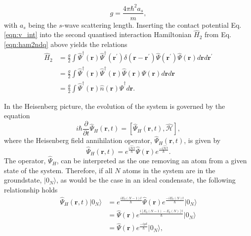 \begin{equation}
	g = \frac{4\pi\hbar^2 a_s}{m},
\end{equation}
with $a_s$ being the $s$-wave scattering length. Inserting the contact potential Eq. \eqref{eqn:v_int} into the second quantised interaction Hamiltonian $\hat{H}_2$ from Eq. \eqref{eqn:ham2ndq} above yields the relations
\begin{subequations}
\begin{align}
\hat{H}_2 &= \frac{g}{2} \int \hat{\Psi}^{\dagger}(\mathbf{r})\hat{\Psi}^{\dagger}(\mathbf{r}^{\prime}) \delta\left(\textbf{r} - \textbf{r}^{\prime}\right)\hat{\Psi}(\mathbf{r}^{\prime})\hat{\Psi}(\textbf{r})d\textbf{r}d\textbf{r}^{\prime} \\
 & = \frac{g}{2}\int \hat{\Psi}^{\dagger}(\textbf{r})\hat{\Psi}^{\dagger}(\mathbf{r}) \hat{\Psi}(\mathbf{r})\hat{\Psi}(\mathbf{r})d\mathbf{r}d\mathbf{r} \\
 & = \frac{g}{2}\int \hat{\Psi}^{\dagger}\left(\mathbf{r}\right)\hat{n}\left(\mathbf{\mathbf{r}}\right)\hat{\Psi}^{\dagger}d\textbf{r}.
\end{align}
\end{subequations}

In the Heisenberg picture, the evolution of the system is governed by the equation
\begin{equation}\label{eqn:heisenberg}
i\hbar \frac{\partial}{\partial t}\hat{\Psi}_H\left(\mathbf{r}, t\right) = \left[\hat{\Psi}_{H}\left(\mathbf{r}, t\right), \hat{\mathcal{H}}  \right],
\end{equation}
where the Heisenberg field annihilation operator, $\hat{\Psi}_H\left(\textbf{r}, t\right)$, is given by
\begin{equation}\label{eqn:psi_heisenberg}
\hat{\Psi}_H\left(\mathbf{r}, {t} \right) = e^{\frac{i\hat{\mathcal{H}}t}{\hbar}}\hat{\Psi}\left(\mathbf{r}\right) e^{\frac{-i\hat{\mathcal{H}}t}{\hbar}}.
\end{equation}
The operator, $\hat{\Psi}_H$, can be interpreted as the one removing an atom from a given state of the system. Therefore, if all $N$ atoms in the system are in the groundstate, $\vert 0_N\rangle$, as would be the case in an ideal condensate, the following relationship holds
\begin{subequations}
\begin{align}
\hat{\Psi}_{H}(\mathbf{r},t)\vert 0_N \rangle &= e^{\frac{iE_0(N-1)t}{\hbar}}\hat{\Psi}(\mathbf{r})e^{\frac{-iE_0(N)t}{\hbar}}\vert 0_N \rangle \\
&= \hat{\Psi}(\mathbf{r})e^{\frac{i[E_0(N-1) - E_0(N)]t}{\hbar}} \vert 0_N \rangle \\
&= \hat{\Psi}(\mathbf{r})e^{\frac{-i\mu t}{\hbar}} \vert 0_N \rangle,\label{eqn:psi_dagger_time} %
\end{align}
\end{subequations}

